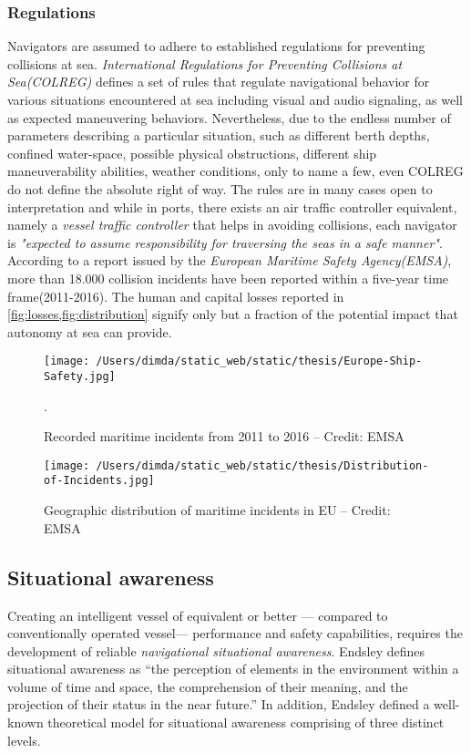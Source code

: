 \subsubsection{Regulations}
Navigators are assumed to adhere to established regulations for preventing collisions at sea. \emph{International Regulations for Preventing Collisions at Sea(COLREG)} defines a set of rules that regulate navigational behavior for various situations encountered at sea including visual and audio signaling,  as well as expected maneuvering behaviors. Nevertheless, due to the endless number of parameters describing a particular situation, such as different berth depths, confined water-space, possible physical obstructions, different ship maneuverability abilities, weather conditions, only to name a few, even COLREG do not define the absolute right of way. The rules are in many cases open to interpretation and while in ports, there exists an air traffic controller equivalent, namely a \emph{vessel traffic controller} that helps in avoiding collisions, each navigator is \textit{"expected to assume responsibility for traversing the seas in a safe manner"}. According to a report issued by the \emph{European Maritime Safety Agency(EMSA)}, more than 18.000 collision incidents have been reported within a five-year time frame(2011-2016). The human and capital losses reported in \cref{fig:losses,fig:distribution} signify only but a fraction of the potential impact that autonomy at sea can provide.

\begin{figure}[H]
	\centering
	\texttt{[image: /Users/dimda/static\_web/static/thesis/Europe-Ship-Safety.jpg]}
	\caption{Recorded maritime incidents from 2011 to 2016 – Credit: EMSA}.
	\label{fig:losses}
\end{figure}


\begin{figure}[H]
	\centering
	\texttt{[image: /Users/dimda/static\_web/static/thesis/Distribution-of-Incidents.jpg]}
	\caption{Geographic distribution of maritime incidents in EU – Credit: EMSA}
	\label{fig:distribution}
\end{figure}

\subsection{Situational awareness}
Creating an intelligent vessel of equivalent or better --- compared to conventionally operated vessel--- performance and safety capabilities, requires the development of reliable \emph{navigational situational awareness}. Endsley  \cite{Endsley1995} defines situational awareness as “the perception of elements in the environment within a volume of time and space, the comprehension of their meaning, and the projection of their status in the near future.”  In addition, Endsley defined a well-known theoretical model for situational awareness  \cite{Endsley2001,Endsley1995} comprising of three distinct levels.

